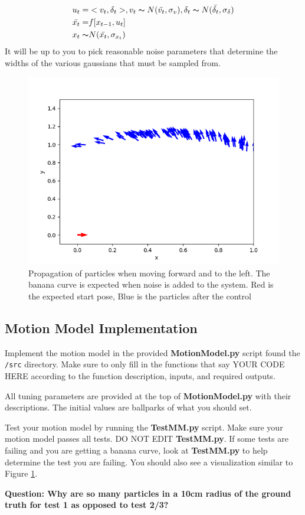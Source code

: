 \documentclass[final]{article}
\newcommand{\code}[1]{\texttt{#1}}
\begin{document}
\begin{align*}
u_t =& <v_t, \delta_t>, v_t \thicksim N(\bar{v_t},\sigma_v), \delta_t \thicksim N(\bar{\delta_t}, \sigma_{\delta}) \\
\bar{x_t} =& f[x_{t-1},u_t] \\
x_t \thicksim & N(\bar{x_t}, \sigma_{x_t})
\end{align*}
It will be up to you to pick reasonable noise parameters that determine the widths of the various gaussians that must be sampled from.

\begin{figure}[!htb]
\centering
\includegraphics[width=0.5\linewidth]{figs/motion_model.png}
\caption{Propagation of particles when moving forward and to the left. The banana curve is expected when noise is added to the system. Red is the expected start pose, Blue is the particles after the control}
\label{fig:motion_model}
\end{figure}
\subsection{Motion Model Implementation}
Implement the motion model in the provided \textbf{MotionModel.py} script found the \code{/src} directory. Make sure to only fill in the functions that say YOUR CODE HERE according to the function description, inputs, and required outputs.

All tuning parameters are provided at the top of \textbf{MotionModel.py} with their descriptions. The initial values are ballparks of what you should set.

Test your motion model by running the \textbf{TestMM.py} script. Make sure your motion model passes all tests. DO NOT EDIT \textbf{TestMM.py}. If some tests are failing and you are getting a banana curve, look at \textbf{TestMM.py} to help determine the test you are failing. You should also see a visualization similar to Figure \ref{fig:motion_model}.

\textbf{Question: Why are so many particles in a 10cm radius of the ground truth for test 1 as opposed to test 2/3?}
\end{document}

